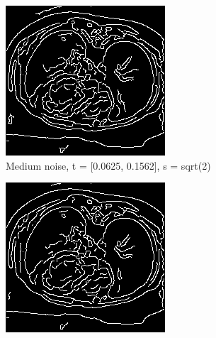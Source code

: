\begin{figure}[H]
  \centering
  
  \begin{subfigure}{.5\textwidth}
    \centering
    \includegraphics[width=.9\textwidth]{./edgedetection/canny_medium_noise/m_noise_def}
    \caption{Medium noise, t = [0.0625, 0.1562], s = sqrt(2)}
    \label{fig:m_noise_def}
  \end{subfigure}%
      \begin{subfigure}{.5\textwidth}
    \centering
    \includegraphics[width=.9\textwidth]{./edgedetection/canny_medium_noise/m_noise_insens_l_thres}

\end{subfigure}
\end{figure}

